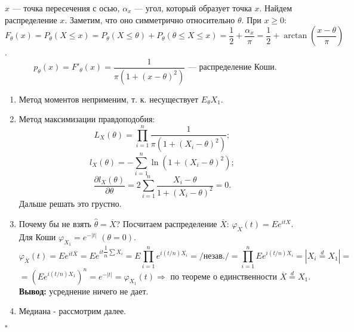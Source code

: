 \documentclass[12pt]{report}
\renewenvironment{proof}{{\bfseries Доказательство:}}{$\square$\\\\}
\theoremstyle{definition}
\begin{document}
\begin{proof}
	$x$ — точка пересечения с осью, $\alpha_x$ — угол, который образует точка $x$. Найдем распределение $x$. Заметим, что оно симметрично относительно $\theta$. При $x \geqslant 0$: $F_\theta(x) = P_\theta(X \leqslant x) = P_\theta(X \leqslant \theta) + P_\theta(\theta \leqslant X \leqslant x) = \dfrac{1}{2} + \dfrac{\alpha_x}{\pi} = \dfrac{1}{2} + \arctan\left(\dfrac{x - \theta}{\pi}\right)$.
	$$p_\theta(x) = F'_\theta(x) = \dfrac{1}{\pi(1 + (x - \theta)^2)} \text{ — распределение Коши}.$$

	\begin{enumerate}
		\item Метод моментов неприменим, т. к. несуществует $E_\theta X_1$.
		\item Метод максимизации правдоподобия: $$L_X(\theta) = \prod_{i=1}^n \dfrac{1}{\pi(1 + (X_i - \theta)^2)};$$ $$l_X(\theta) = -\sum_{i=1}^n \ln(1 + (X_i - \theta)^2);$$ $$\dfrac{\partial l_X(\theta)}{\partial \theta} = 2\sum_{i = 1}^n \dfrac{X_i - \theta}{1 + (X_i - \theta)^2} = 0.$$ Дальше решать это грустно.
		\item Почему бы не взять $\hat{\theta} = \overline{X}$? Посчитаем распределение $\overline{X}$: $\varphi_X(t) = E e^{itX}$. Для Коши $\varphi_{X_1} = e^{-|t|}$ $(\theta = 0)$.
		$$\varphi_{\overline{X}} (t) = E e^{it\overline{X}} = Ee^{it\dfrac{1}{n} \sum X_i} = E\prod_{i=1}^n e^{i(t/n)X_i} = /\text{незав.}/ = \prod_{i=1}^n Ee^{i(t/n)X_i} = |X_i \stackrel{d}{=} X_1| = $$ $$=\left(Ee^{i(t/n)X_1}\right)^n = e^{-|t|} = \varphi_{X_1}(t) \Rightarrow \text{ по теореме о единственности } \overline{X} \stackrel{d}{=} X_1.$$
		\textbf{Вывод:} усреднение ничего не дает.
		\item Медиана - рассмотрим далее.
	\end{enumerate}
\end{proof}
\end{document}
